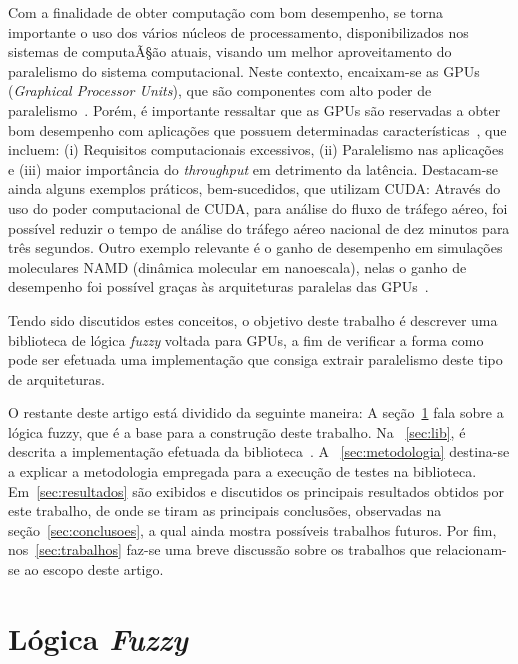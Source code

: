 \documentclass[12pt]{article}
\begin{document}
	Com a finalidade de obter computação com bom desempenho, se torna importante o uso dos vários núcleos de processamento, disponibilizados nos sistemas de computaÃ§ão atuais, visando um melhor aproveitamento do paralelismo do sistema computacional. Neste contexto, encaixam-se as GPUs (\textit{Graphical Processor Units}), que são componentes com alto poder de paralelismo~\cite{sengupta:07}. Porém, é importante ressaltar que as GPUs são reservadas a obter bom desempenho com aplicações que possuem determinadas características~\cite{owens:08}, que incluem: (i) Requisitos computacionais excessivos, (ii) Paralelismo nas aplicações e (iii) maior importância do \textit{throughput} em detrimento da latência. Destacam-se ainda alguns exemplos práticos, bem-sucedidos, que utilizam CUDA:
Através do uso do poder computacional de CUDA, para análise do fluxo de tráfego aéreo, foi possível reduzir o tempo de análise do tráfego aéreo nacional de dez minutos para três segundos. Outro exemplo relevante é o ganho de desempenho em simulações moleculares NAMD (dinâmica molecular em nanoescala), nelas o ganho de desempenho foi possível graças às arquiteturas paralelas das GPUs~\cite{nvidia:15}.


	Tendo sido discutidos estes conceitos, o objetivo deste trabalho é descrever uma biblioteca de lógica \textit{fuzzy} voltada para GPUs, a fim de verificar a forma como pode ser efetuada uma implementação que consiga extrair paralelismo deste tipo de arquiteturas.
	

	O restante deste artigo está dividido da seguinte maneira: A seção~\ref{sec:logfuzzy} fala sobre a lógica fuzzy, que é a base para a construção deste trabalho. Na ~\ref{sec:lib}, é descrita a implementação efetuada da biblioteca~\libname. A ~\ref{sec:metodologia} destina-se a explicar a metodologia empregada para a execução de testes na biblioteca. Em~\ref{sec:resultados} são exibidos e discutidos os principais resultados obtidos por este trabalho, de onde se tiram as principais conclusões, observadas na seção~\ref{sec:conclusoes}, a qual ainda mostra possíveis trabalhos futuros. Por fim, nos~\ref{sec:trabalhos} faz-se uma breve discussão sobre os trabalhos que relacionam-se ao escopo deste artigo.

\section{Lógica \textit{Fuzzy}}
\label{sec:logfuzzy}
\end{document}
